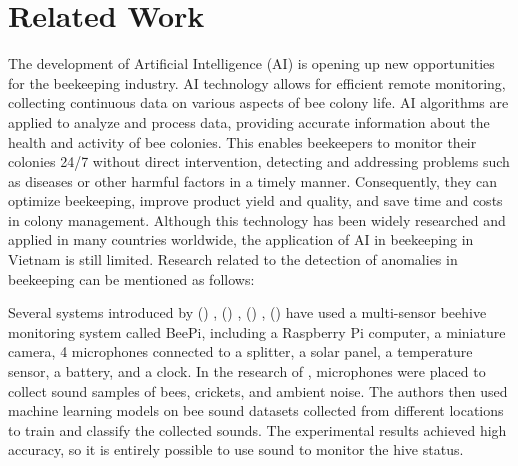 \section{Related Work}
The development of Artificial Intelligence (AI) is opening up new opportunities for the
beekeeping industry. AI technology allows for efficient remote monitoring, collecting
continuous data on various aspects of bee colony life. AI algorithms are applied to analyze
and process data, providing accurate information about the health and activity of bee
colonies. This enables beekeepers to monitor their colonies 24/7 without direct
intervention, detecting and addressing problems such as diseases or other harmful
factors in a timely manner. Consequently, they can optimize beekeeping, improve product
yield and quality, and save time and costs in colony management. Although this technology
has been widely researched and applied in many countries worldwide, the application of AI
in beekeeping in Vietnam is still limited. Research related to the detection of anomalies
in beekeeping can be mentioned as follows:

Several systems introduced by
\citeauthor{schurischuster2016sensor} (\citeyear{schurischuster2016sensor}) \cite{schurischuster2016sensor},
\citeauthor{zacepins2016remote} (\citeyear{zacepins2016remote}) \cite{zacepins2016remote},
\citeauthor{antonio2017frequency} (\citeyear{antonio2017frequency}) \cite{antonio2017frequency},
\citeauthor{crawford2017automated} (\citeyear{crawford2017automated}) \cite{crawford2017automated}
have used a multi-sensor beehive monitoring system
called BeePi, including a Raspberry Pi computer, a miniature camera, 4 microphones connected
to a splitter, a solar panel, a temperature sensor, a battery, and a clock. In the research
of \citeauthor{kulyukin2018toward} \cite{kulyukin2018toward}, microphones were placed to collect sound samples of bees,
crickets, and ambient noise. The authors then used machine learning models on bee sound
datasets collected from different locations to train and classify the collected sounds.
The experimental results achieved high accuracy, so it is entirely possible to use sound
to monitor the hive status.

